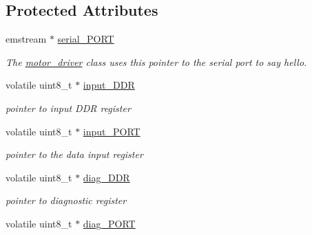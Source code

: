\subsection*{Protected Attributes}
\begin{DoxyCompactItemize}
\item 
\hypertarget{classmotor__driver_a98a0c18a3b4d8b61266f98437aab12a9}{emstream $\ast$ \hyperlink{classmotor__driver_a98a0c18a3b4d8b61266f98437aab12a9}{serial\-\_\-\-P\-O\-R\-T}}\label{classmotor__driver_a98a0c18a3b4d8b61266f98437aab12a9}

\begin{DoxyCompactList}\small\item\em The \hyperlink{classmotor__driver}{motor\-\_\-driver} class uses this pointer to the serial port to say hello. \end{DoxyCompactList}\item 
\hypertarget{classmotor__driver_aa9ce032000d0eb28499df3fa53255022}{volatile uint8\-\_\-t $\ast$ \hyperlink{classmotor__driver_aa9ce032000d0eb28499df3fa53255022}{input\-\_\-\-D\-D\-R}}\label{classmotor__driver_aa9ce032000d0eb28499df3fa53255022}

\begin{DoxyCompactList}\small\item\em pointer to input D\-D\-R register \end{DoxyCompactList}\item 
\hypertarget{classmotor__driver_ad821a9c32c2e296373f5273db99e3f59}{volatile uint8\-\_\-t $\ast$ \hyperlink{classmotor__driver_ad821a9c32c2e296373f5273db99e3f59}{input\-\_\-\-P\-O\-R\-T}}\label{classmotor__driver_ad821a9c32c2e296373f5273db99e3f59}

\begin{DoxyCompactList}\small\item\em pointer to the data input register \end{DoxyCompactList}\item 
\hypertarget{classmotor__driver_a6b1aa2bcd4eecada6abe2e3d11fecd88}{volatile uint8\-\_\-t $\ast$ \hyperlink{classmotor__driver_a6b1aa2bcd4eecada6abe2e3d11fecd88}{diag\-\_\-\-D\-D\-R}}\label{classmotor__driver_a6b1aa2bcd4eecada6abe2e3d11fecd88}

\begin{DoxyCompactList}\small\item\em pointer to diagnostic register \end{DoxyCompactList}\item 
\hypertarget{classmotor__driver_af0259585bf3d8d7a3cf236913255a543}{volatile uint8\-\_\-t $\ast$ \hyperlink{classmotor__driver_af0259585bf3d8d7a3cf236913255a543}{diag\-\_\-\-P\-O\-R\-T}}\label{classmotor__driver_af0259585bf3d8d7a3cf236913255a543}


\end{DoxyCompactItemize}
